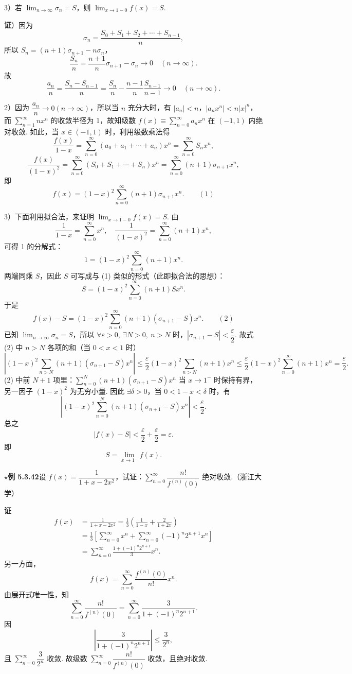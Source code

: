 \documentclass[UTF8, 12pt, fontset=fandol, oneside]{ctexart}
\begin{document}
3）若 $\displaystyle\lim_{n\to\infty}\sigma_n=S$，则 $\displaystyle\lim_{x\to1-0}f(x)=S$.

\noindent\textbf{证}）因为
\[
  \sigma_n=\frac{S_0+S_1+S_2+\cdots+S_{n-1}}{n},
\]
所以 $S_n=(n+1)\sigma_{n+1}-n\sigma_n$，
\[
  \frac{S_n}{n}=\frac{n+1}{n}\sigma_{n+1}-\sigma_n\to0\quad(n\to\infty).
\]
故
\[
  \frac{a_n}{n}=\frac{S_n-S_{n-1}}{n}
  =\frac{S_n}{n}-\frac{n-1}{n}\frac{S_{n-1}}{n-1}\to0\quad(n\to\infty).
\]

2）因为 $\dfrac{a_n}{n}\to0(n\to\infty)$，所以当 $n$ 充分大时，有 $|a_n|<n$，$|a_nx^n|<n|x|^n$，而 $\displaystyle\sum_{n=1}^{\infty}nx^n$ 的收敛半径为 1，故知级数 $f(x)\equiv\displaystyle\sum_{n=0}^{\infty}a_nx^n$ 在 $(-1,1)$ 内绝对收敛. 如此，当 $x\in(-1,1)$ 时，利用级数乘法得
\[
  \frac{f(x)}{1-x}
  =\sum_{n=0}^{\infty}(a_0+a_1+\cdots+a_n)x^n
  =\sum_{n=0}^{\infty}S_nx^n,
\]
\[
  \frac{f(x)}{(1-x)^2}
  =\sum_{n=0}^{\infty}(S_0+S_1+\cdots+S_n)x^n
  =\sum_{n=0}^{\infty}(n+1)\sigma_{n+1}x^n,
\]
即
\[
  f(x)=(1-x)^2\sum_{n=0}^{\infty}(n+1)\sigma_{n+1}x^n. \qquad(1)
\]

3）下面利用拟合法，来证明 $\displaystyle\lim_{x\to1-0}f(x)=S$. 由
\[
  \frac1{1-x}=\sum_{n=0}^{\infty}x^n,\quad
  \frac1{(1-x)^2}=\sum_{n=0}^{\infty}(n+1)x^n,
\]
可得 1 的分解式：
\[
  1=(1-x)^2\sum_{n=0}^{\infty}(n+1)x^n.
\]
两端同乘 $S$，因此 $S$ 可写成与 (1) 类似的形式（此即拟合法的思想）：
\[
  S=(1-x)^2\sum_{n=0}^{\infty}(n+1)Sx^n.
\]
于是
\[
  f(x)-S=(1-x)^2\sum_{n=0}^{\infty}(n+1)(\sigma_{n+1}-S)x^n. \qquad(2)
\]
已知 $\displaystyle\lim_{n\to\infty}\sigma_n=S$，所以 $\forall\varepsilon>0,\ \exists N>0,\ n>N$ 时，$|\sigma_{n+1}-S|<\dfrac\varepsilon2$. 故式 (2) 中 $n>N$ 各项的和（当 $0<x<1$ 时）
\[
  \left|(1-x)^2\sum_{n>N}(n+1)(\sigma_{n+1}-S)x^n\right|
  \le\frac\varepsilon2(1-x)^2\sum_{n>N}(n+1)x^n
  \le\frac\varepsilon2(1-x)^2\sum_{n=0}^{\infty}(n+1)x^n
  =\frac\varepsilon2.
\]
(2) 中前 $N+1$ 项里：$\displaystyle\sum_{n=0}^N(n+1)(\sigma_{n+1}-S)x^n$ 当 $x\to1^-$ 时保持有界，另一因子 $(1-x)^2$ 为无穷小量. 因此 $\exists\delta>0$，当 $0<1-x<\delta$ 时，有
\[
  \left|(1-x)^2\sum_{n=0}^N(n+1)(\sigma_{n+1}-S)x^n\right|<\frac\varepsilon2.
\]
总之
\[
  |f(x)-S|<\frac\varepsilon2+\frac\varepsilon2=\varepsilon.
\]
即
\[
  S=\lim_{x\to1^-}f(x).
\]

\noindent\textbf{\(\star\)例 5.3.42}\quad 设 $f(x)=\dfrac1{1+x-2x^2}$，试证：$\displaystyle\sum_{n=0}^{\infty}\dfrac{n!}{f^{(n)}(0)}$ 绝对收敛.（浙江大学）

\noindent\textbf{证}\quad
\[
\begin{aligned}
f(x)&=\frac1{1+x-2x^2}
=\frac13\left(\frac1{1-x}+\frac2{1+2x}\right)\\
&=\frac13\left[\sum_{n=0}^{\infty}x^n+\sum_{n=0}^{\infty}(-1)^n2^{n+1}x^n\right]\\
&=\sum_{n=0}^{\infty}\frac{1+(-1)^n2^{n+1}}3x^n.
\end{aligned}
\]
另一方面，
\[
  f(x)=\sum_{n=0}^{\infty}\frac{f^{(n)}(0)}{n!}x^n.
\]
由展开式唯一性，知
\[
  \sum_{n=0}^{\infty}\frac{n!}{f^{(n)}(0)}
  =\sum_{n=0}^{\infty}\frac3{1+(-1)^n2^{n+1}}.
\]
因
\[
  \left|\frac3{1+(-1)^n2^{n+1}}\right|\le\frac3{2^n},
\]
且 $\displaystyle\sum_{n=0}^{\infty}\dfrac3{2^n}$ 收敛. 故级数 $\displaystyle\sum_{n=0}^{\infty}\dfrac{n!}{f^{(n)}(0)}$ 收敛，且绝对收敛.
\end{document}
